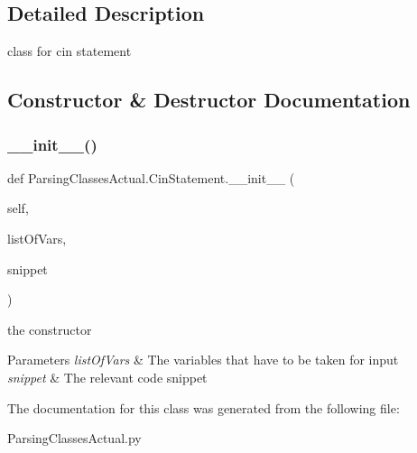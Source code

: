 \subsection{Detailed Description}
class for cin statement 

\subsection{Constructor \& Destructor Documentation}
\mbox{\label{class_parsing_classes_actual_1_1_cin_statement_a33f554b86027e75caf334cdf023d357f}} 
\subsubsection{\texorpdfstring{\+\_\+\+\_\+init\+\_\+\+\_\+()}{\_\_init\_\_()}}
{\footnotesize\ttfamily def Parsing\+Classes\+Actual.\+Cin\+Statement.\+\_\+\+\_\+init\+\_\+\+\_\+ (\begin{DoxyParamCaption}\item[{}]{self,  }\item[{}]{list\+Of\+Vars,  }\item[{}]{snippet }\end{DoxyParamCaption})}



the constructor 


\begin{DoxyParams}{Parameters}
{\em list\+Of\+Vars} & The variables that have to be taken for input \\
\hline
{\em snippet} & The relevant code snippet \\
\hline
\end{DoxyParams}


The documentation for this class was generated from the following file\+:\begin{DoxyCompactItemize}
\item 
Parsing\+Classes\+Actual.\+py\end{DoxyCompactItemize}
